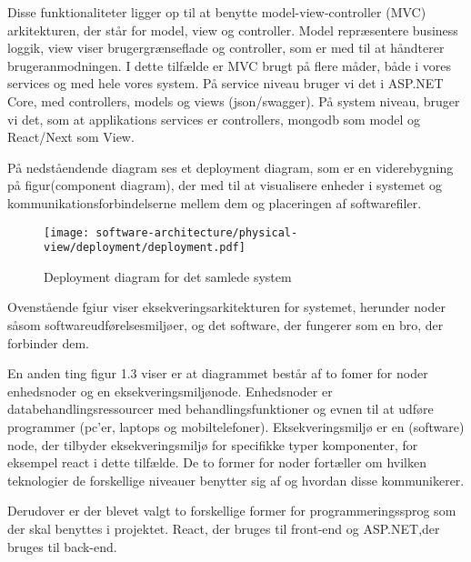Disse funktionaliteter ligger op til at benytte model-view-controller (MVC) arkitekturen, der står for model, view og controller. Model repræsentere business loggik, view viser brugergrænseflade og controller, som er med til at håndterer brugeranmodningen. I dette tilfælde er MVC brugt på flere måder, både i vores services og med hele vores system. På service niveau bruger vi det i ASP.NET Core, med controllers, models og views (json/swagger). På system niveau, bruger vi det, som at applikations services er  controllers, mongodb som model og React/Next som View.

På nedståendende diagram ses et deployment diagram, som er en viderebygning på figur(component diagram), der med til at visualisere enheder i systemet og kommunikationsforbindelserne mellem dem og placeringen af softwarefiler.

\begin{figure}[ht]
    \centering
\texttt{[image: software-architecture/physical-view/deployment/deployment.pdf]}
\caption{Deployment diagram for det samlede system}
\label{fig:figure2}
\end{figure}

Ovenstående fgiur viser eksekveringsarkitekturen for systemet, herunder noder såsom softwareudførelsesmiljøer, og det software, der fungerer som en bro, der  forbinder dem. 

En anden ting figur 1.3 viser er at diagrammet består af to fomer for noder enhedsnoder og en eksekveringsmiljønode. Enhedsnoder er  databehandlingsressourcer med behandlingsfunktioner og evnen til at udføre programmer (pc'er, laptops og mobiltelefoner).  Eksekveringsmiljø er en (software) node, der tilbyder eksekveringsmiljø for specifikke typer komponenter, for eksempel react i dette tilfælde. De to former for noder fortæller om hvilken teknologier de forskellige niveauer benytter sig af og hvordan disse kommunikerer.

Derudover er der blevet valgt to forskellige former for programmeringssprog som der skal benyttes i projektet. React, der bruges til front-end og ASP.NET,der bruges til back-end. 

